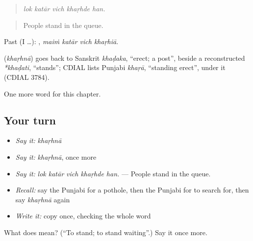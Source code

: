 \begin{quote}
    
\end{quote}

\begin{quote}
\emph{lok katār vich khaṛhde han.}
\end{quote}

\begin{quote}
People stand in the queue.
\end{quote}

Past (I …):    , \emph{maiṁ katār vich khaṛhiā}.

\begin{cousinweb}
\textbf{} (\emph{khaṛhnā}) goes back to Sanskrit \emph{khaḍaka}, \textquotedblleft{}erect; a post\textquotedblright{}, beside a reconstructed \emph{*khaḍati}, \textquotedblleft{}stands\textquotedblright{}; CDIAL lists Punjabi \emph{khaṛā}, \textquotedblleft{}standing erect\textquotedblright{}, under it (CDIAL 3784).
\end{cousinweb}

\begin{grammarlens}[title={What you've built}]
One more word for this chapter.
\end{grammarlens}

\subsection*{Your turn}
\begin{itemize}
\raggedright
  \item \emph{Say it:} \emph{khaṛhnā}
  \item \emph{Say it:} \emph{khaṛhnā}, once more
  \item \emph{Say it:} \emph{lok katār vich khaṛhde han.} — People stand in the queue.
  \item \emph{Recall:} say the Punjabi for a pothole, then the Punjabi for to search for, then say \emph{khaṛhnā} again
  \item \emph{Write it:} copy \textbf{} once, checking the whole word
\end{itemize}

\begin{tcolorbox}[breakable,colback=teal!4,colframe=teal!35!black,title={Before you move on}]
What does  mean? (\textquotedblleft{}To stand; to stand waiting\textquotedblright{}.) Say it once more.
\end{tcolorbox}
